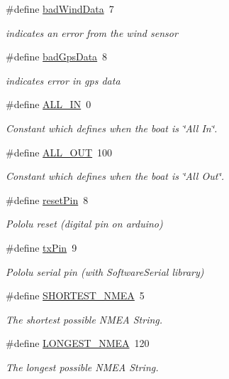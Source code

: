 \begin{DoxyCompactItemize}
\#define \hyperlink{group__globalconstants_ga55cee1ec4df41dd9b7b71c6aa9619bfc}{bad\-Wind\-Data}~7
\begin{DoxyCompactList}\small\item\em indicates an error from the wind sensor \end{DoxyCompactList}\item 
\#define \hyperlink{group__globalconstants_ga5219c41d9ae91432ffb55ec7aeef8873}{bad\-Gps\-Data}~8
\begin{DoxyCompactList}\small\item\em indicates error in gps data \end{DoxyCompactList}\item 
\#define \hyperlink{group__globalconstants_gaaadbf956e6981264e6bf369a08269821}{\-A\-L\-L\-\_\-\-I\-N}~0
\begin{DoxyCompactList}\small\item\em \-Constant which defines when the boat is \char`\"{}\-All In\char`\"{}. \end{DoxyCompactList}\item 
\#define \hyperlink{group__globalconstants_ga074485974be5a03e711020873d83fd90}{\-A\-L\-L\-\_\-\-O\-U\-T}~100
\begin{DoxyCompactList}\small\item\em \-Constant which defines when the boat is \char`\"{}\-All Out\char`\"{}. \end{DoxyCompactList}\item 
\#define \hyperlink{group__globalconstants_gad67ff299260393832da3b34efaaee56a}{reset\-Pin}~8
\begin{DoxyCompactList}\small\item\em \-Pololu reset (digital pin on arduino) \end{DoxyCompactList}\item 
\#define \hyperlink{group__globalconstants_ga38340aff22e726c77f9cf87b5bea10dd}{tx\-Pin}~9
\begin{DoxyCompactList}\small\item\em \-Pololu serial pin (with \-Software\-Serial library) \end{DoxyCompactList}\item 
\#define \hyperlink{group__globalconstants_gac6759acd1da41c55495c6e5ee91e86e9}{\-S\-H\-O\-R\-T\-E\-S\-T\-\_\-\-N\-M\-E\-A}~5
\begin{DoxyCompactList}\small\item\em \-The shortest possible \-N\-M\-E\-A \-String. \end{DoxyCompactList}\item 
\#define \hyperlink{group__globalconstants_ga0038dced6b4ccdfe2ef833cc1965ca73}{\-L\-O\-N\-G\-E\-S\-T\-\_\-\-N\-M\-E\-A}~120
\begin{DoxyCompactList}\small\item\em \-The longest possible \-N\-M\-E\-A \-String. \end{DoxyCompactList}\end{DoxyCompactItemize}
